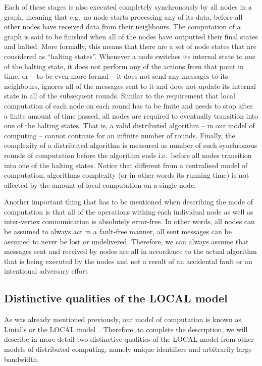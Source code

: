 Each of these stages is also executed
completely synchronously by all nodes in a graph, meaning that e.g.\ no node starts processing
any of its data, before all other nodes have received data from their neighbours. The computation
of a graph is said to be finished when all of the nodes have outputted their final states
and halted. More formally, this means that there are a set of node states that are
considered as ``halting states''. Whenever a node switches its internal state to one of the 
halting state, it does not perform any of the actions from that point in time, or -- to
be even more formal -- it does not send any messages to its neighbours, ignores all of the 
messages sent to it and does not update its internal state in all of the subsequent rounds.
Similar to the requirement that local computation of each node on each round has to be finite
and needs to stop after a finite amount of time passed, all nodes are required to eventually
transition into one of the halting states. That is, a valid distributed algorithm -- in our model of
computing -- cannot continue for an infinite number of rounds. Finally,
the complexity of a distributed algorithm is measured as number of such synchronous rounds
of computation before the algorithm ends i.e.\ before all nodes transition into one of 
the halting states. Notice that different from a centralised model of computation,
algorithms complexity (or in other words its running time) is not affected by the
amount of local computation on a single node.

Another important thing that has to be mentioned when describing the mode of computation
is that all of the operations withing each individual node as well as inter-vertex
communication is absolutely error-free. In other words, all nodes can be assumed to
always act in a fault-free manner, all sent messages can be assumed to never be lost
or undelivered. Therefore, we can always assume that messages sent and received by nodes
are all in accordence to the actual algorithm that is being executed by the nodes 
and not a result of an accidental fault or an intentional adversary effort

\subsection{Distinctive qualities of the LOCAL model}

As was already mentioned previously, our model of computation is known
as Linial's or the LOCAL model~\cite{Linial1987}. Therefore, to complete the
description, we will describe in more detail two distinctive qualities of the LOCAL model
from other models of distributed computing, namely unique identifiers and arbitrarily large
bandwidth.

